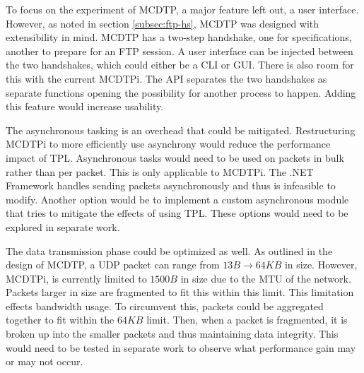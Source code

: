 To focus on the experiment of MCDTP, a major feature left out, a user interface. However, as noted in section \ref{subsec:ftp-hs}, MCDTP was designed with extensibility in mind. MCDTP has a two-step handshake, one for specifications, another to prepare for an FTP session. A user interface can be injected between the two handshakes, which could either be a CLI or GUI. There is also room for this with the current MCDTPi. The API separates the two handshakes as separate functions opening the possibility for another process to happen. Adding this feature would increase usability.

The asynchronous tasking is an overhead that could be mitigated. Restructuring MCDTPi to more efficiently use asynchrony would reduce the performance impact of TPL. Asynchronous tasks would need to be used on packets in bulk rather than per packet. This is only applicable to MCDTPi. The .NET Framework handles sending packets asynchronously and thus is infeasible to modify. Another option would be to implement a custom asynchronous module that tries to mitigate the effects of using TPL. These options would need to be explored in separate work.

The data transmission phase could be optimized as well. As outlined in the design of MCDTP, a UDP packet can range from $13B \rightarrow 64KB$ in size. However, MCDTPi, is currently limited to $1500B$ in size due to the MTU of the network. Packets larger in size are fragmented to fit this within this limit. This limitation effects bandwidth usage. To circumvent this, packets could be aggregated together to fit within the $64KB$ limit. Then, when a packet is fragmented, it is broken up into the smaller packets and thus maintaining data integrity. This would need to be tested in separate work to observe what performance gain may or may not occur.
